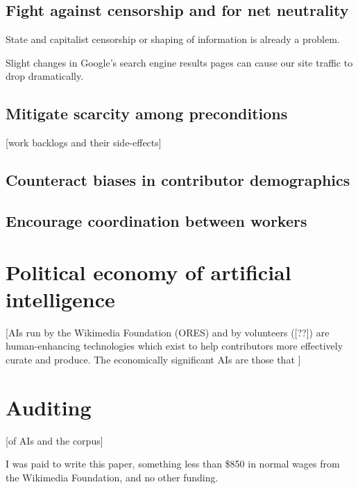 \documentclass[format=sigconf, authorversion]{acmart}
\begin{document}
\subsection{Fight against censorship and for net neutrality}

State and capitalist censorship or shaping of information is already a problem.

Slight changes in Google's search engine results pages can cause our site traffic to drop dramatically.

\subsection{Mitigate scarcity among preconditions}

[work backlogs and their side-effects]

\subsection{Counteract biases in contributor demographics}

\subsection{Encourage coordination between workers}

\section{Political economy of artificial intelligence}

[AIs run by the Wikimedia Foundation (ORES) and by volunteers ([??]) are human-enhancing technologies which exist to help contributors more effectively curate and produce.  The economically significant AIs are those that ]

\section{Auditing}

[of AIs and the corpus]

\begin{acks}
I was paid to write this paper, something less than \$850 in normal wages from the Wikimedia Foundation, and no other funding.
\end{acks}



\glsaddall
\printglossary[nonumberlist]
\end{document}
